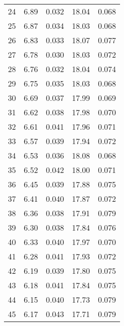 \begin{table}
\begin{tabular}{c|ll|ll}
24 & 6.89 & 0.032 & 18.04 & 0.068 \\
25 & 6.87 & 0.034 & 18.03 & 0.068 \\
26 & 6.83 & 0.033 & 18.07 & 0.077 \\
27 & 6.78 & 0.030 & 18.03 & 0.072 \\
28 & 6.76 & 0.032 & 18.04 & 0.074 \\
29 & 6.75 & 0.035 & 18.03 & 0.068 \\
30 & 6.69 & 0.037 & 17.99 & 0.069 \\
31 & 6.62 & 0.038 & 17.98 & 0.070 \\
32 & 6.61 & 0.041 & 17.96 & 0.071 \\
33 & 6.57 & 0.039 & 17.94 & 0.072 \\
34 & 6.53 & 0.036 & 18.08 & 0.068 \\
35 & 6.52 & 0.042 & 18.00 & 0.071 \\
36 & 6.45 & 0.039 & 17.88 & 0.075 \\
37 & 6.41 & 0.040 & 17.87 & 0.072 \\
38 & 6.36 & 0.038 & 17.91 & 0.079 \\
39 & 6.30 & 0.038 & 17.84 & 0.076 \\
40 & 6.33 & 0.040 & 17.97 & 0.070 \\
41 & 6.28 & 0.041 & 17.93 & 0.072 \\
42 & 6.19 & 0.039 & 17.80 & 0.075 \\
43 & 6.18 & 0.041 & 17.84 & 0.075 \\
44 & 6.15 & 0.040 & 17.73 & 0.079 \\
45 & 6.17 & 0.043 & 17.71 & 0.079 \\
               \hline
        \end{tabular}
    \end{table}
    \clearpage

